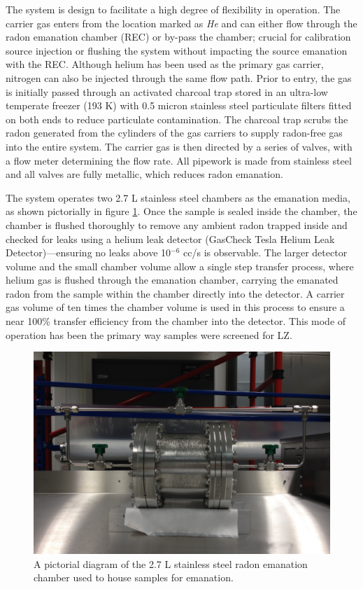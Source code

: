 The system is design to facilitate a high degree of flexibility in operation. The carrier gas enters from the location marked as \textit{He} and can either flow through the radon emanation chamber (REC) or by-pass the chamber; crucial for calibration source injection or flushing the system without impacting the source emanation with the REC. Although helium has been used as the primary gas carrier, nitrogen can also be injected through the same flow path. Prior to entry, the gas is initially passed through an activated charcoal trap stored in an ultra-low temperate freezer (193 K) with 0.5 micron stainless steel particulate filters fitted on both ends to reduce particulate contamination. The charcoal trap scrubs the radon generated from the cylinders of the gas carriers to supply radon-free gas into the entire system. The carrier gas is then directed by a series of valves, with a flow meter determining the flow rate. All pipework is made from stainless steel and all valves are fully metallic, which reduces radon emanation.

The system operates two 2.7 L stainless steel chambers as the emanation media, as shown pictorially in figure \ref{fig:detector_chamber}. Once the sample is sealed inside the chamber, the chamber is flushed thoroughly to remove any ambient radon trapped inside and checked for leaks using a helium leak detector (GasCheck Tesla Helium Leak Detector)---ensuring no leaks above 10$^{−6}$ cc/s is observable. The larger detector volume and the small chamber volume allow a single step transfer process, where helium gas is flushed through the emanation chamber, carrying the emanated radon from the sample within the chamber directly into the detector. A carrier gas volume of ten times the chamber volume is used in this process to ensure a near 100\% transfer efficiency from the chamber into the detector. This mode of operation has been the primary way samples were screened for LZ.
%
\begin{figure}[]
    \centering
    \includegraphics[scale=0.4]{Chapter_4/Figures/radon_system_chamber.png}
    \caption[A pictorial diagram of the 2.7 L stainless steel radon emanation chamber used to house samples for emanation.]
    {A pictorial diagram of the 2.7 L stainless steel radon emanation chamber used to house samples for emanation.}
    \label{fig:detector_chamber}
\end{figure}
%

